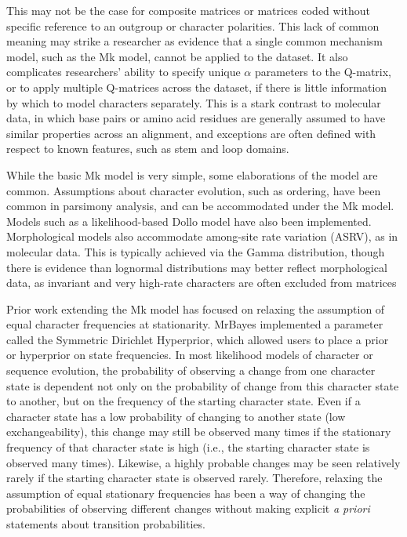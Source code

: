 \documentclass[]{sysbio}
\begin{document}
	This may not be the case for composite matrices or matrices coded without specific reference to an outgroup or character polarities.
	This lack of common meaning may strike a researcher as evidence that a single common mechanism model, such as the Mk model, cannot be applied to the dataset.
	It also complicates researchers' ability to specify unique $\alpha$ parameters to the Q-matrix, or to apply multiple Q-matrices across the dataset, if there is little information by which to model characters separately.
	This is a stark contrast to molecular data, in which base pairs or amino acid residues are generally assumed to have similar properties across an alignment, and exceptions are often defined with respect to known features, such as stem and loop domains. 
\par
	While the basic Mk model is very simple, some elaborations of the model are common.
	Assumptions about character evolution, such as ordering, have been common in parsimony analysis, and can be accommodated under the Mk model. 
	Models such as a likelihood-based Dollo model have also been implemented. 
	Morphological models also accommodate among-site rate variation (ASRV), as in molecular data.
	This is typically achieved via the Gamma distribution, though there is evidence than lognormal distributions may better reflect morphological data, as invariant and very high-rate characters are often excluded from matrices \citep{Harrison2014} \par
Prior work extending the Mk model has focused on relaxing the assumption of equal character frequencies at stationarity.
MrBayes implemented a parameter called the Symmetric Dirichlet Hyperprior, which allowed users to place a prior or hyperprior on state frequencies. 
In most likelihood models of character or sequence evolution, the probability of observing a change from one character state is dependent not only on the probability of change from this character state to another, but on the frequency of the starting character state.
Even if a character state  has a low probability of changing to another state (low exchangeability), this change may still be observed many times if the stationary frequency of that character state is high (i.e., the starting character state is observed many times). 
Likewise, a highly probable changes may be seen relatively rarely if the starting character state is observed rarely. 
Therefore, relaxing the assumption of equal stationary frequencies has been a way of changing the probabilities of observing different changes without making explicit \textit{a priori} statements about transition probabilities. \par
\end{document}
